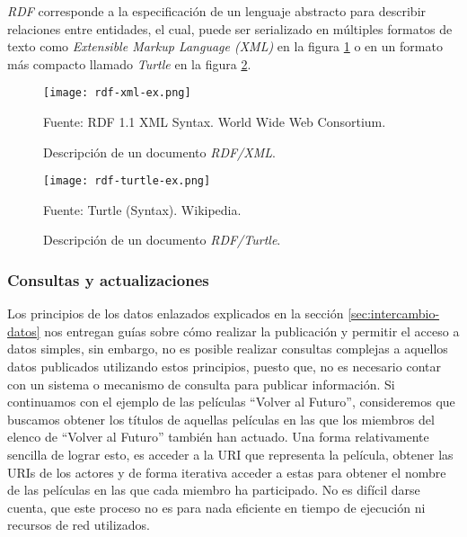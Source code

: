 \textit{RDF} corresponde a la especificación de un lenguaje abstracto para
describir relaciones entre entidades, el cual, puede ser serializado en
múltiples formatos de texto como \textit{Extensible Markup Language (XML)}
\cite{beckett2004rdf} en la figura \ref{fig:rdf-xml-ex} o en un formato más
compacto llamado \textit{Turtle} \cite{beckett2014rdf} en la figura
\ref{fig:rdf-turtle-ex}.

\begin{figure}
    \centering
    \texttt{[image: rdf-xml-ex.png]}
    \caption{Descripción de un documento \textit{RDF/XML}.} Fuente: RDF 1.1 XML
    Syntax. World Wide Web Consortium.
    \label{fig:rdf-xml-ex}
\end{figure}

\begin{figure}
    \centering
    \texttt{[image: rdf-turtle-ex.png]}
    \caption{Descripción de un documento \textit{RDF/Turtle}.} Fuente: Turtle
    (Syntax). Wikipedia.
    \label{fig:rdf-turtle-ex}
\end{figure}

\subsubsection{Consultas y actualizaciones}

Los principios de los datos enlazados explicados en la sección
\ref{sec:intercambio-datos} nos entregan guías sobre cómo realizar la
publicación y permitir el acceso a datos simples, sin embargo, no es posible
realizar consultas complejas a aquellos datos publicados utilizando estos
principios, puesto que, no es necesario contar con un sistema o mecanismo de
consulta para publicar información. Si continuamos con el ejemplo de las
películas ``Volver al Futuro'', consideremos que buscamos obtener los títulos de
aquellas películas en las que los miembros del elenco de ``Volver al Futuro''
también han actuado. Una forma relativamente sencilla de lograr esto, es acceder
a la URI que representa la película, obtener las URIs de los actores y de forma
iterativa acceder a estas para obtener el nombre de las películas en las
que cada miembro ha participado. No es difícil darse cuenta, que este proceso no
es para nada eficiente en tiempo de ejecución ni recursos de red utilizados.

